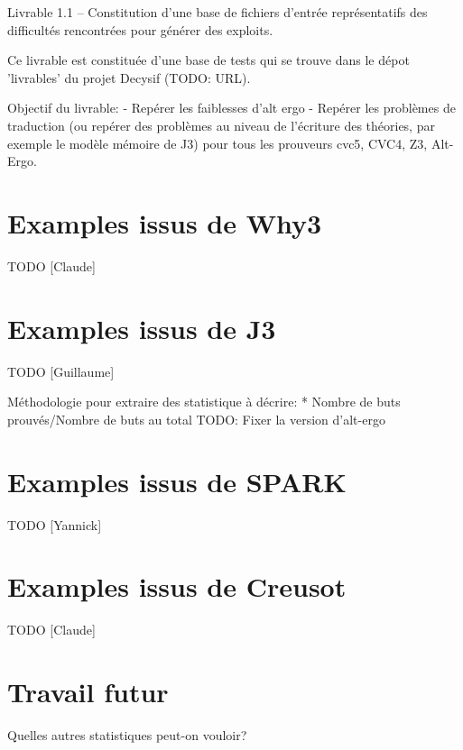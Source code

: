 \documentclass{article}
\begin{document}
Livrable 1.1 -- Constitution d’une base de fichiers d’entrée
représentatifs des difficultés rencontrées pour
générer des exploits.



Ce livrable est constituée d'une base de tests qui se trouve
dans le dépot 'livrables' du projet Decysif (TODO: URL).

Objectif du livrable:
- Repérer les faiblesses d'alt ergo
- Repérer les problèmes de traduction (ou repérer des problèmes au niveau de l'écriture des théories, par exemple le modèle mémoire de J3) pour tous les prouveurs cvc5, CVC4, Z3, Alt-Ergo.



\section{Examples issus de Why3}

TODO [Claude]

\section{Examples issus de J3}

TODO [Guillaume]

Méthodologie pour extraire des statistique à décrire:
* Nombre de buts prouvés/Nombre de buts au total
TODO: Fixer la version d'alt-ergo

\section{Examples issus de SPARK}

TODO [Yannick]

\section{Examples issus de Creusot}

TODO [Claude]

\section{Travail futur}

Quelles autres statistiques peut-on vouloir?
\end{document}
